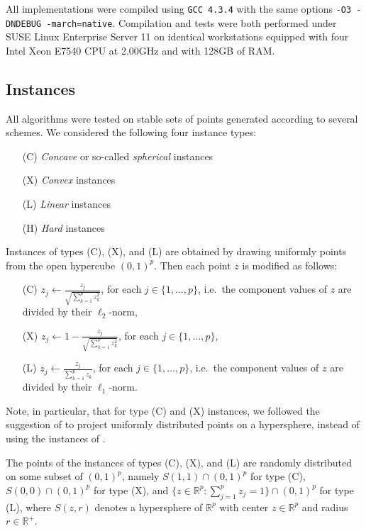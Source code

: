 \documentclass[a4paper,11pt]{article}
\newcommand{\R}{\ensuremath{\mathds{R}}}
\newcommand{\Bzero}{0}
\newcommand{\Bone}{1}
\begin{document}
All implementations were compiled using \texttt{GCC 4.3.4} with the same options 
\texttt{-O3 -DNDEBUG -march=native}. Compilation and tests were both performed 
under SUSE Linux Enterprise Server 11 
on identical workstations equipped with four Intel Xeon E7540 CPU at 2.00GHz and with 128GB of RAM.




\subsection{Instances}\label{sub:instances}

All algorithms were tested on stable sets of points generated according to several schemes.
We considered the following four instance types:
\begin{itemize}
  \item[(C)] \emph{Concave} or so-called \emph{spherical} \citep{DebThiLauZit02} instances
  \item[(X)] \emph{Convex} instances
  \item[(L)] \emph{Linear} instances  
  \item[(H)] \emph{Hard} instances
\end{itemize}

\noindent Instances of types (C), (X), and (L) are obtained by drawing uniformly points 
from the open hypercube $(0,1)^p$. Then each point $z$ is modified as follows:
\begin{itemize}
  \item[(C)] $z_j \leftarrow \frac{z_j}{\sqrt{\sum_{k=1}^{p} z_k^2}}$, 
  for each $j\in \{1, \dots, p\}$, i.e.\ the component values of $z$ are divided by
  their $\ell_2$-norm,  \item[(X)] $z_j \leftarrow 1-\frac{z_j}{\sqrt{\sum_{k=1}^{p} z_k^2}}$,
  for each $j\in \{1, \dots, p\}$,
  \item[(L)] $z_j \leftarrow \frac{z_j}{\sum_{k=1}^{p} z_k}$, 
  for each $j\in \{1, \dots, p\}$, i.e.\ the component values of $z$ are divided by
  their $\ell_1$-norm.\end{itemize}

\noindent Note, in particular, that for type (C) and (X) instances, we followed the suggestion of \citet{RusFra14}
to project uniformly distributed points on a hypersphere, instead of using the instances of \citet{DebThiLauZit02}.

\noindent The points of the instances of types (C), (X), and (L) are randomly distributed on some subset of 
$(0,1)^p$, namely 
$S(\Bone,  1) \cap (0,1)^p$ for type (C),  
$S(\Bzero, 0) \cap (0,1)^p$ for type (X), and
$\{z\in \R^p: \sum_{j=1}^p z_j = 1\}\cap (0,1)^p$ for type (L), 
where $S(z,r)$ denotes a hypersphere of $\R^p$ with center $z\in\R^p$ and radius $r\in \R^+$.
\end{document}
